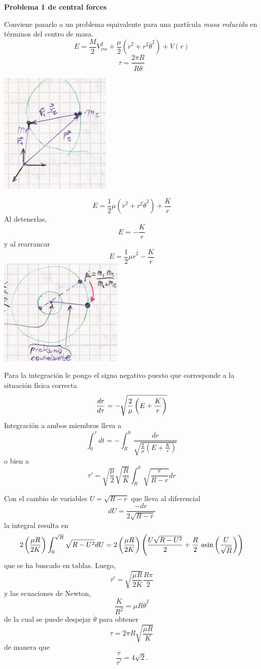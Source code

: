 \documentclass[10pt,oneside]{CBFT_book}
\begin{document}
\begin{ejemplo}{\bf Problema 1 de central forces}

Conviene pasarlo a un problema equivalente para una partícula {\it masa reducida} en términos del centro de masa.
\[
	E = \frac M 2 V_{cm}^2 + \frac \mu 2 ( \dot{r}^2 + r^2\dot{\theta}^2 ) + V( r )
\]
\[
	\tau = \frac{2\pi R}{R\dot{\theta}}
\]

\includegraphics[scale=0.4]{images/fig_mc_central_forces1.jpg}

\[
	E = \frac 1 2 \mu(\dot{r}^2 + r^2\dot{\theta}^2 ) + \frac K r
\]
Al detenerlas,
\[
	E = - \frac K r
\]
y al rearrancar
\[
	E = \frac 1 2 \mu \dot{r}^2 - \frac K r
\]
\includegraphics[scale=0.4]{images/fig_mc_central_forces2.jpg}

Para la integración le pongo el signo negativo puesto que corresponde a la situación física correcta
\[
	\frac{d^{\hspace{-0.05em}} {r}}{d {\tau}^{\hspace{-0.05em}}} = -\sqrt{ \frac 2 \mu \left(E + \frac K r \right) }
\]
Integración a ambos miembros lleva a
\[
	\int_0^\tau dt = - \int_R^0 \frac{dr}{ \sqrt{ \frac 2 \mu \left(E + \frac K r \right) } }
\]
o bien a 
\[
	\tau' = \sqrt{\frac{\mu}{2}} \sqrt{\frac{R}{K}} \int_R^0 \sqrt{\frac{r}{R-r}} dr
\]

Con el cambio de variables $U=\sqrt{R-r}$ que lleva al diferencial 
\[
	dU = \frac{-dr}{2\sqrt{R-r}}
\]
la integral resulta en 
\[
  	2 \left( \frac{ \mu R }{ 2K } \right) \int_0^{\sqrt{R}} \sqrt{ R - U^2 } dU =
 	2 \left( \frac{\mu R}{2K}\right) \left( \frac{ U\sqrt{R-U^2} }{2} + \frac{R}{2} 
 	\text{ asin}\left( \frac{U}{\sqrt{R}}\right) \right)
\]
que se ha buscado en tablas.
Luego,
\[
	\tau' = \sqrt{ \frac{\mu R}{2K} }\frac{R\pi}{2}
\]
y las ecuaciones de Newton,
\[
	\frac{K}{R^2} = \mu R\dot{\theta}^2 
\]
de la cual se puede despejar $\dot{\theta}$ para obtener
\[
	\tau = 2 \pi R \sqrt{\frac{\mu R}{K}}
\]
de manera que 
\[
	\frac{ \tau }{ \tau' } = 4 \sqrt{ 2 }.
\]
\end{ejemplo}
\end{document}
